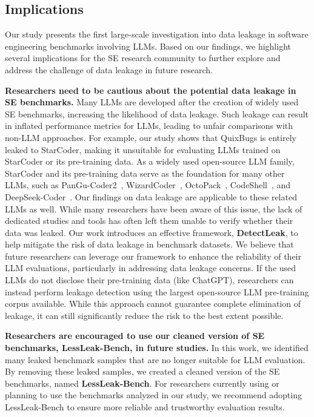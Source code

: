 

\subsection{Implications}
Our study presents the first large-scale investigation into data leakage in software engineering benchmarks involving LLMs. Based on our findings, we highlight several implications for the SE research community to further explore and address the challenge of data leakage in future research.

\vspace{0.1cm}
\noindent
\textbf{Researchers need to be cautious about the potential data leakage in SE benchmarks.} Many LLMs are developed after the creation of widely used SE benchmarks, increasing the likelihood of data leakage. Such leakage can result in inflated performance metrics for LLMs, leading to unfair comparisons with non-LLM approaches. For example, our study shows that QuixBugs is entirely leaked to StarCoder, making it unsuitable for evaluating LLMs trained on StarCoder or its pre-training data. As a widely used open-source LLM family, StarCoder and its pre-training data serve as the foundation for many other LLMs, such as PanGu-Coder2~\cite{shen2023pangu}, WizardCoder~\cite{luo2023wizardcoder}, OctoPack~\cite{muennighoff2023octopack}, CodeShell~\cite{xie2024codeshell}, and DeepSeek-Coder~\cite{deepseekcoder}. Our findings on data leakage are applicable to these related LLMs as well.
While many researchers have been aware of this issue, the lack of dedicated studies and tools has often left them unable to verify whether their data was leaked. Our work introduces an effective framework, \textbf{DetectLeak}, to help mitigate the risk of data leakage in benchmark datasets. We believe that future researchers can leverage our framework to enhance the reliability of their LLM evaluations, particularly in addressing data leakage concerns. 
If the used LLMs do not disclose their pre-training data (like ChatGPT), researchers can instead perform leakage detection using the largest open-source LLM pre-training corpus available. While this approach cannot guarantee complete elimination of leakage, it can still significantly reduce the risk to the best extent possible.


\vspace{0.1cm}
\noindent
\textbf{Researchers are encouraged to use our cleaned version of SE benchmarks, LessLeak-Bench, in future studies.}
In this work, we identified many leaked benchmark samples that are no longer suitable for LLM evaluation. By removing these leaked samples, we created a cleaned version of the SE benchmarks, named \textbf{LessLeak-Bench}. For researchers currently using or planning to use the benchmarks analyzed in our study, we recommend adopting LessLeak-Bench to ensure more reliable and trustworthy evaluation results.





